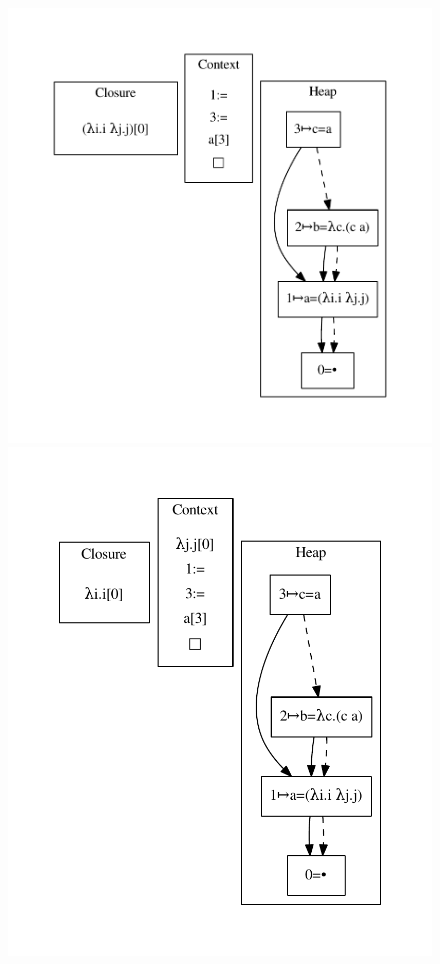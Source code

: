 \begin{figure}
\includegraphics[width=\linewidth/3]{figures/12.pdf}
\includegraphics[width=\linewidth/3]{figures/13.pdf}

\end{figure}
